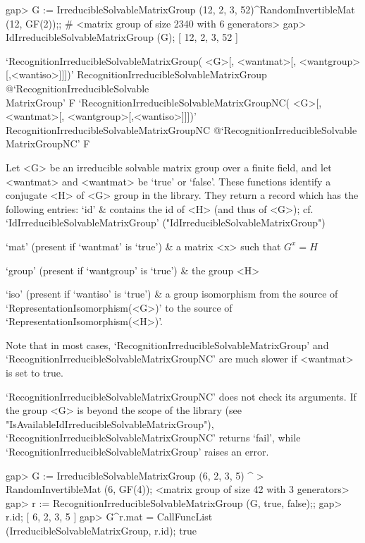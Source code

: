 \beginexample
gap> G := IrreducibleSolvableMatrixGroup (12, 2, 3, 52)^RandomInvertibleMat (12, GF(2));;
# <matrix group of size 2340 with 6 generators>
gap> IdIrreducibleSolvableMatrixGroup (G);
[ 12, 2, 3, 52 ]
\endexample


\>`RecognitionIrreducibleSolvableMatrixGroup(%
   <G>[, <wantmat>[, <wantgroup>[,<wantiso>]]])'%
{RecognitionIrreducibleSolvableMatrixGroup}%
@{`RecognitionIrreducibleSolvable\\MatrixGroup'} F
\>`RecognitionIrreducibleSolvableMatrixGroupNC(%
   <G>[, <wantmat>[, <wantgroup>[,<wantiso>]]])'%
{RecognitionIrreducibleSolvableMatrixGroupNC}%
@{`RecognitionIrreducibleSolvable\\MatrixGroupNC'} F

Let <G> be an irreducible solvable matrix group over a finite field, and let
<wantmat> and <wantmat> be `true' or `false'. 
These functions identify a conjugate <H> of <G> group in the library. 
They return a record which has the following entries:
\beginitems
`id' &  contains the id of <H> (and thus of <G>); 
    cf. `IdIrreducibleSolvableMatrixGroup'  ("IdIrreducibleSolvableMatrixGroup")

`mat' (present if `wantmat' is `true') &
    a matrix <x> such that $G^x = H$

`group' (present if `wantgroup' is `true') & the group <H> 

`iso' (present if `wantiso' is `true') & a group isomorphism from the source of
    `RepresentationIsomorphism(<G>)' to the source of `RepresentationIsomorphism(<H>)'.
    
\enditems
Note that in most cases, `Recog\-nition\-Irreducible\-Solvable\-Matrix\-Group' and 
`Recog\-nition\-Irreducible\-Sol\-vable\-Matrix\-Group\-NC' are 
much slower if <wantmat> is set to true.   

`RecognitionIrreducibleSolvableMatrixGroupNC' does not check its arguments. If
the group <G> is beyond the scope of the {\IRREDSOL} library (see "IsAvailableIdIrreducibleSolvableMatrixGroup"), `RecognitionIrreducibleSolvableMatrixGroupNC' returns `fail', while `RecognitionIrreducibleSolvableMatrixGroup' raises an error.

\beginexample
gap> G := IrreducibleSolvableMatrixGroup (6, 2, 3, 5) ^
>         RandomInvertibleMat (6, GF(4));
<matrix group of size 42 with 3 generators>
gap> r := RecognitionIrreducibleSolvableMatrixGroup (G, true, false);;
gap> r.id;
[ 6, 2, 3, 5 ]
gap> G^r.mat = CallFuncList (IrreducibleSolvableMatrixGroup, r.id);
true
\endexample



